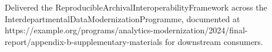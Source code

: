 \documentclass[fontsize=10pt, margin=narrow, medium=print]{careerdossier-resume}
\begin{document}
\MakeCDossierHeader
{}
\begin{CDossierEntry}[
  title        = {Principal Data Scientist},
  organization = {Digital Services Laboratory},
  location     = {Ontario, Canada},
  dates        = {September 2024--Present}
]
  \begin{CDossierItemize}
    \item Delivered the ReproducibleArchivalInteroperabilityFramework across
          the InterdepartmentalDataModernizationProgramme, documented at
          https://example.org/programs/analytics-modernization/2024/final-report/appendix-b-supplementary-materials
          for downstream consumers.
  \end{CDossierItemize}
\end{CDossierEntry}
\end{document}
